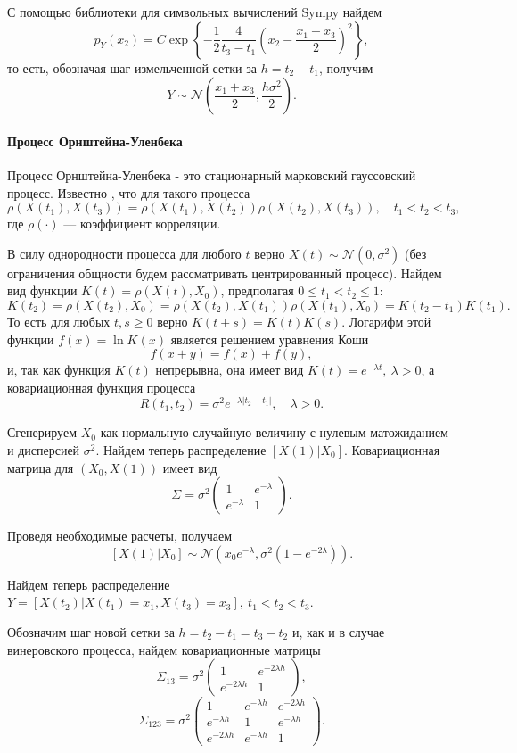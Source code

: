 \documentclass[16pt]{article}
\newcommand\A{(\cdot)}
\begin{document}
С помощью библиотеки для символьных вычислений Sympy найдем
$$p_Y(x_2) = C \exp\left\{ -\dfrac12\dfrac{4}{t_3 - t_1} \left(x_2 - \dfrac{x_1 + x_3}2\right)^2\right\},$$
то есть, обозначая шаг измельченной сетки за $h = t_2 - t_1$, получим $$Y \sim \mathcal{N}\left(\dfrac{x_1 + x_3}{2}, \dfrac{h\sigma^2}{2}\right).$$

\paragraph{Процесс Орнштейна-Уленбека}

Процесс Орнштейна-Уленбека - это стационарный марковский гауссовский процесс.
Известно \cite{Feller}, что для такого процесса 
$$\rho(X(t_1), X(t_3)) = \rho(X(t_1), X(t_2))\rho(X(t_2), X(t_3)), \quad t_1 < t_2 < t_3,$$
где $\rho\A$ --- коэффициент корреляции.

В силу однородности процесса для любого $t$ верно $X(t) \sim \mathcal{N}(0, \sigma^2)$ (без ограничения общности будем рассматривать центрированный процесс).
Найдем вид функции $K(t) = \rho(X(t), X_0)$, предполагая $0 \leq t_1 < t_2 \leq 1$:
$$ K(t_2) = \rho(X(t_2), X_0) = \rho(X(t_2), X(t_1))\rho(X(t_1), X_0) = K(t_2 - t_1)K(t_1).$$
То есть для любых $t, s \geq 0$ верно $K(t + s) = K(t)K(s)$. Логарифм этой функции $f(x) = \ln K(x)$ является решением уравнения Коши
$$f(x + y) = f(x) + f(y),$$
и, так как функция $K(t)$ непрерывна, она имеет вид
$K(t) = e^{-\lambda t}, \ \lambda > 0$, а ковариационная функция процесса
$$R(t_1, t_2) = \sigma^2 e^{-\lambda |t_2 - t_1|}, \quad \lambda > 0.$$

Сгенерируем $X_0$ как нормальную случайную величину с нулевым матожиданием и дисперсией $\sigma^2$.
Найдем теперь распределение $[X(1)|X_0]$.
Ковариационная матрица для $(X_0, X(1))$ имеет вид 
$$
\Sigma = \sigma^2 \begin{pmatrix} 
1 & e^{-\lambda} \\
e^{-\lambda} & 1
\end{pmatrix}.
$$

Проведя необходимые расчеты, получаем $$[X(1)|X_0] \sim \mathcal{N}\left(x_0e^{-\lambda}, \sigma^2 (1 -e^{-2\lambda})\right).$$

Найдем теперь распределение $Y = [X(t_2)|X(t_1) = x_1, X(t_3) = x_3],\ t_1 < t_2 < t_3$.

Обозначим шаг новой сетки за $h = t_2 - t_1 = t_3 - t_2$ и, как и в случае винеровского процесса, найдем ковариационные матрицы
$$
\Sigma_{13} = \sigma^2 \begin{pmatrix} 
1 & e^{-2\lambda h} \\
e^{-2 \lambda h} & 1
\end{pmatrix},
$$
$$
\Sigma_{123} = \sigma^2 \begin{pmatrix}
1 & e^{-\lambda h} & e^{-2 \lambda h} \\
e^{-\lambda h} & 1 & e^{-\lambda h} \\
e^{-2\lambda h} & e^{-\lambda h} & 1
\end{pmatrix}.
$$
\end{document}

